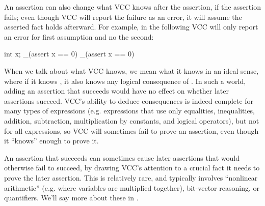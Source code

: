 

An assertion can also change what VCC knows after the assertion, if
the assertion fails; even though VCC will report the failure as an error,
it will assume the asserted fact holds afterward. For example, in the following
VCC will only report an error for first assumption and no the second:
\begin{VCC}
int x;
_(assert x == 0)
_(assert x == 0)
\end{VCC}

When we talk about what VCC knows, we mean what it knows in an ideal
sense, where if it knows , it also knows any logical
consequence of . In such a world, adding an assertion that
succeeds would have no effect on whether later assertions succeed.
VCC's ability to deduce consequences is indeed complete for many types
of expressions (e.g. expressions that use only equalities,
inequalities, addition, subtraction, multiplication by constants, and
logical operators), but not for all expressions, so VCC will
sometimes fail to prove an assertion, even though it ``knows'' enough
to prove it.  

An assertion that succeeds can sometimes cause later assertions that
would otherwise fail to succeed, by drawing VCC's attention to a
crucial fact it needs to prove the later assertion.  This is
relatively rare, and typically involves ``nonlinear arithmetic''
(e.g. where variables are multiplied together), bit-vector reasoning,
or quantifiers. We'll say more about these in .

